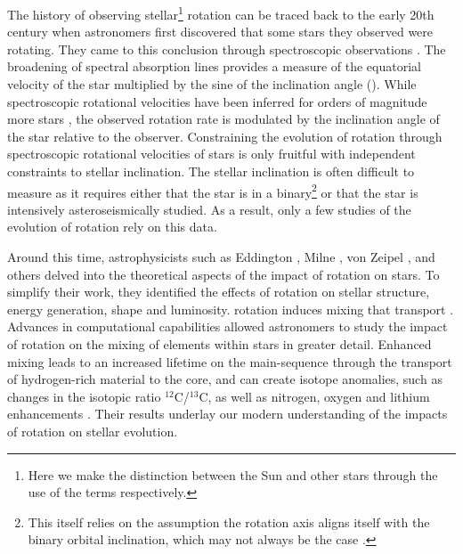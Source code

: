 The history of observing stellar\footnote{Here we make the distinction between the Sun and other stars through the use of the terms  respectively.} rotation can be traced back to the early 20th century when astronomers first discovered that some stars they observed were rotating. 
They came to this conclusion through spectroscopic observations \citep{elvey_contours_1929, struve_stellar_1930, struve_axial_1930}.
The broadening of spectral absorption lines provides a measure of the equatorial velocity of the star multiplied by the sine of the inclination angle (\vsini).
While spectroscopic rotational velocities have been inferred for orders of magnitude more stars , the observed rotation rate is modulated by the  inclination angle of the star relative to the observer.
Constraining the evolution of rotation through spectroscopic rotational velocities of stars is only fruitful with independent constraints to stellar inclination.
The stellar inclination is often difficult to measure as it requires either that the star is in a binary\footnote{This itself relies on the assumption the rotation axis aligns itself with the binary orbital inclination, which may not always be the case \citep{albrecht_banana_2011,albrecht_banana_2013}.} or that the star is intensively asteroseismically studied.
As a result, only a few studies of the evolution of rotation rely on this data.

Around this time, astrophysicists such as Eddington \citep{eddington_conditions_1918,eddington_internal_1926,eddington_internal_1929}, Milne \citep{milne_equilibrium_1923}, von Zeipel \citep{von_zeipel_radiative_1924}, and others delved into the theoretical aspects of the impact of rotation on stars.
To simplify their work, they identified the effects of rotation on stellar structure, energy generation, shape and luminosity. 
 rotation induces mixing that  transport .
Advances in computational capabilities allowed astronomers to study the impact of rotation on the mixing of elements within stars in greater detail. 
Enhanced mixing leads to an increased lifetime on the main-sequence through the transport of hydrogen-rich material to the core, and can create isotope anomalies, such as changes in the isotopic ratio $^{12}$C/$^{13}$C, as well as nitrogen, oxygen and lithium enhancements \citep{maeder_evolution_2000,heger_presupernova_2000,charbonnel_lithium_1994}.
Their results underlay our modern understanding of the impacts of rotation on stellar evolution.

